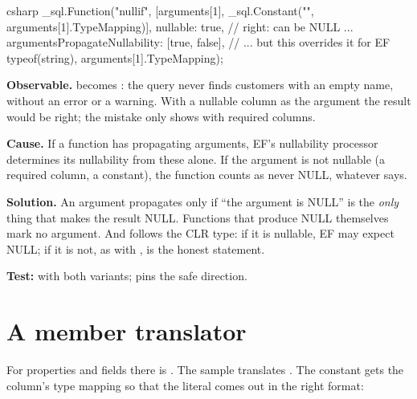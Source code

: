 \begin{sourcecode}{csharp}
_sql.Function("nullif", [arguments[1], _sql.Constant("", arguments[1].TypeMapping)],
    nullable: true,                                   // right: can be NULL ...
    argumentsPropagateNullability: [true, false],     // ... but this overrides it for EF
    typeof(string), arguments[1].TypeMapping);
\end{sourcecode}

\begin{failure}
  \textbf{Observable.}
  becomes : the query never finds customers with an empty name, without an
  error or a warning. With a nullable column as the argument the result would be right; the
  mistake only shows with required columns.

  \textbf{Cause.} If a function has propagating arguments, EF's nullability processor
  determines its nullability from these alone. If the argument is not nullable (a required
  column, a constant), the function counts as never NULL, whatever  says.

  \textbf{Solution.} An argument propagates only if “the argument is NULL” is the
  \emph{only} thing that makes the result NULL. Functions that produce NULL themselves mark no
  argument. And  follows the CLR type: if it is nullable, EF may expect NULL;
  if it is not, as with ,  is the honest statement.

  \textbf{Test:}
  with both variants;
  pins the safe direction.
\end{failure}

\section{A member translator}

For properties and fields there is . The sample
translates . The constant gets
the column's type mapping so that the literal comes out in the right format:

